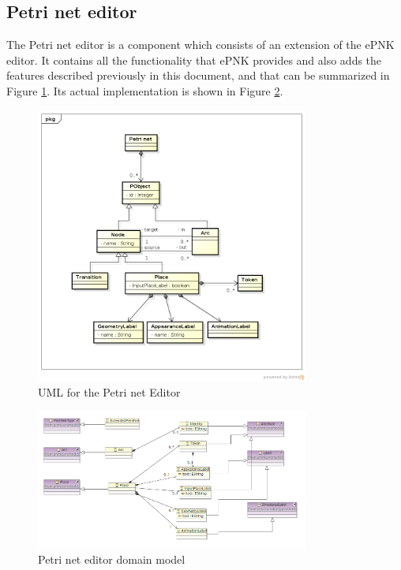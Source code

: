 \subsection{Petri net editor}

The Petri net editor is a component which consists of an extension of the ePNK editor. It contains all the functionality that ePNK provides and also adds the features described previously in this document, and that can be summarized in Figure \ref{fig:uml-petrinet-editor}. Its actual implementation is shown in Figure \ref{fig:petri-net-domain-model}.

\begin{figure}[htp]
\begin{center}
  \includegraphics[width=0.8\textwidth]{image/petrinet_uml.png}
  \caption{UML for the Petri net Editor}
  \label{fig:uml-petrinet-editor}
\end{center}
\end{figure}

\begin{figure}[htp]
\begin{center}
  \includegraphics[width=0.8\textwidth]{image/petrinet_editor_domain.png}
  \caption{Petri net editor domain model}
  \label{fig:petri-net-domain-model}
\end{center}
\end{figure}

